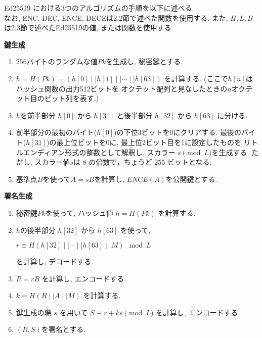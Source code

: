 Ed25519 における3つのアルゴリズムの手順を以下に述べる.\\
\indent なお, ENC, DEC, ENCE, DECEは2.2節で述べた関数を使用する.
また, $H, L, B$は2.3節で述べたEd25519の値, または関数を使用する.\\[1em]
\let\ltxlist\list
\begin{breakitembox}[l]{\textbf{鍵生成}}
  　
  \begin{enumerate}[parsep=7pt]
    \item $256$バイトのランダムな値$Pk$を生成し, 秘密鍵とする.
    \item $h=H(Pk)=(h[0]\mid\mid h[1]\mid\mid \cdots\mid\mid h[63])$
    を計算する. (ここで$h[n]$はハッシュ関数の出力512ビットを
    オクテット配列と見なしたときの$n$オクテット目のビット列を表す.)
    \item $h$を前半部分 $h[0]$ から $h[31]$ と後半部分 $h[32]$ から $h[63]$ に分ける.
    \item 前半部分の最初のバイト($h[0]$)の下位3ビットを0にクリアする.
    最後のバイト($h[31]$)の最上位ビットを0に, 最上位2ビット目を1に設定したものを
    リトルエンディアン形式の整数として解釈し, スカラー $s \pmod L$を生成する. 
    ただし, スカラー値$s$は 8 の倍数で，ちょうど 255 ビットとなる.
    \item 基準点$B$を使って$A = sB$を計算し, $ENCE(A)$を公開鍵とする. 
  \end{enumerate}
\end{breakitembox}
\vspace{2em}
\let\ltxlist\list
\begin{breakitembox}[l]{\textbf{署名生成}}
  　
  \begin{enumerate}[parsep=7pt]
    \item 秘密鍵$Pk$を使って, ハッシュ値 $h=H(Pk)$ を計算する.
    \item $h$の後半部分 $h[32]$ から $h[63]$ を使って, 
    \begin{center}
      $r \equiv H(h[32]\mid\mid \cdots \mid\mid h[63] \mid\mid M) \mod L$
    \end{center}
    を計算し, デコードする.
    \item $R=rB$ を計算し, エンコードする.
    \item $k=H(R \mid\mid A \mid\mid M)$ を計算する.
    \item 鍵生成の際 $s$ を用いて $S\equiv r+ks \pmod L$ を計算し, エンコードする.
    \item $(R,S)$を署名とする.
  \end{enumerate}
\end{breakitembox}
